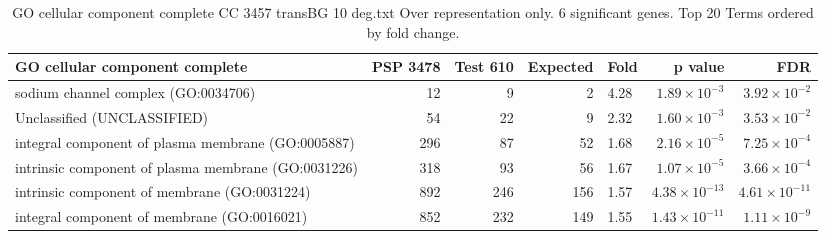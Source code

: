 

\begin{table}[ht]
\centering
\begin{adjustbox}{width=\textwidth}
\begin{tabular}{lrrrlrr}
  \hline
GO cellular component complete & PSP 3478 & Test 610 & Expected & Fold & p value & FDR \\ 
  \hline
sodium channel complex (GO:0034706) & 12 & 9 & 2 & 4.28 & $1.89 \times 10^{-3}$ & $3.92 \times 10^{-2}$ \\ 
  Unclassified (UNCLASSIFIED) & 54 & 22 & 9 & 2.32 & $1.60 \times 10^{-3}$ & $3.53 \times 10^{-2}$ \\ 
  integral component of plasma membrane (GO:0005887) & 296 & 87 & 52 & 1.68 & $2.16 \times 10^{-5}$ & $7.25 \times 10^{-4}$ \\ 
  intrinsic component of plasma membrane (GO:0031226) & 318 & 93 & 56 & 1.67 & $1.07 \times 10^{-5}$ & $3.66 \times 10^{-4}$ \\ 
  intrinsic component of membrane (GO:0031224) & 892 & 246 & 156 & 1.57 & $4.38 \times 10^{-13}$ & $4.61 \times 10^{-11}$ \\ 
  integral component of membrane (GO:0016021) & 852 & 232 & 149 & 1.55 & $1.43 \times 10^{-11}$ & $1.11 \times 10^{-9}$ \\ 
   \hline
\end{tabular}
\end{adjustbox}
\caption{GO cellular component complete CC 3457 transBG 10 deg.txt Over representation only. 6 significant genes. Top 20 Terms ordered by fold change. } 
\label{tab:GO cellular component complete CC 3457 transBG 10 deg.txt Over representation only. 6 significant genes. Top 20 Terms ordered by fold change. }
\end{table}


